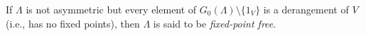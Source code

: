 If $\Lambda$ is not asymmetric but every element of $G_0(\Lambda) \setminus \{1_V\}$ is a derangement of $V$ (i.e., has no fixed points), then $\Lambda$ is said to be \emph{fixed-point free}.
